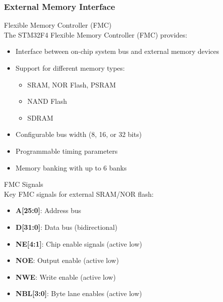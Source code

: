 \subsubsection{External Memory Interface}

\begin{concept}{Flexible Memory Controller (FMC)}\\
The STM32F4 Flexible Memory Controller (FMC) provides:
\begin{itemize}
    \item Interface between on-chip system bus and external memory devices
    \item Support for different memory types:
    \begin{itemize}
        \item SRAM, NOR Flash, PSRAM
        \item NAND Flash
        \item SDRAM
    \end{itemize}
    \item Configurable bus width (8, 16, or 32 bits)
    \item Programmable timing parameters
    \item Memory banking with up to 6 banks
\end{itemize}
\end{concept}

\begin{definition}{FMC Signals}\\
Key FMC signals for external SRAM/NOR flash:
\begin{itemize}
    \item \textbf{A[25:0]}: Address bus
    \item \textbf{D[31:0]}: Data bus (bidirectional)
    \item \textbf{NE[4:1]}: Chip enable signals (active low)
    \item \textbf{NOE}: Output enable (active low)
    \item \textbf{NWE}: Write enable (active low)
    \item \textbf{NBL[3:0]}: Byte lane enables (active low)
\end{itemize}
\end{definition}

